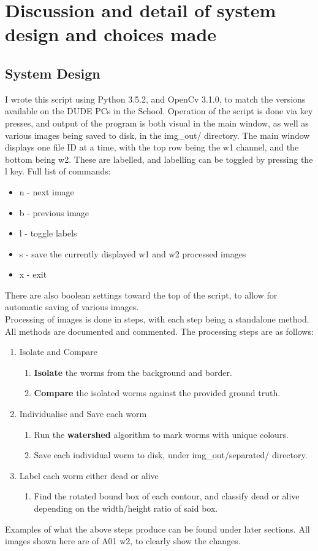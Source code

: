 \documentclass[a4paper,12pt]{article}
\begin{document}
\section*{Discussion and detail of system design and choices made}
\subsection*{System Design}
I wrote this script using Python 3.5.2, and OpenCv 3.1.0, to match the versions available on the DUDE PCs in the School.
Operation of the script is done via key presses, and output of the program is both visual in the main window, as well as various images being saved to disk, in the img\_out/ directory.
The main window displays one file ID at a time, with the top row being the w1 channel, and the bottom being w2. These are labelled, and labelling can be toggled by pressing the l key.
Full list of commands:
\begin{itemize}
    \item n - next image
    \item b - previous image
    \item l - toggle labels
    \item s - save the currently displayed w1 and w2 processed images
    \item x - exit
\end{itemize}
There are also boolean settings toward the top of the script, to allow for automatic saving of various images. \\
Processing of images is done in steps, with each step being a standalone method. All methods are documented and commented. The processing steps are as follows:
\begin{enumerate}
    \item Isolate and Compare
    \begin{enumerate}
        \item\textbf{Isolate} the worms from the background and border.
        \item\textbf{Compare} the isolated worms against the provided ground truth.
    \end{enumerate}

    \item Individualise and Save each worm
    \begin{enumerate}
        \item Run the \textbf{watershed} algorithm to mark worms with unique colours.
        \item Save each individual worm to disk, under img\_out/separated/ directory.
    \end{enumerate}

    \item Label each worm either dead or alive
    \begin{enumerate}
        \item Find the rotated bound box of each contour, and classify dead or alive depending on the width/height ratio of said box.
    \end{enumerate}
\end{enumerate}
Examples of what the above steps produce can be found under later sections. All images shown here are of A01 w2, to clearly show the changes.
\end{document}

